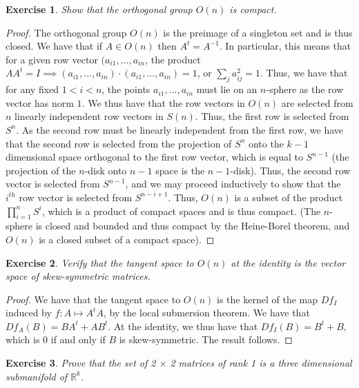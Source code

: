 \documentclass{article}
\newtheorem{exercise}{Exercise}
\begin{document}
\begin{exercise}
Show that the orthogonal group $O(n)$ is compact.
\end{exercise}

\begin{proof}
The orthogonal group $O(n)$ is the preimage of a singleton set and is thus closed. We have that if $A \in O(n)$ then $A^{t} = A^{-1}$. In particular, this means that for a given row vector $(a_{i1},...,a_{in}$, the product $AA^{t} = I \implies (a_{i1},...,a_{in}) \cdot (a_{i1},...,a_{in}) = 1$, or $\sum_{j}a_{ij}^{2} = 1$. Thus, we have that for any fixed $1< i < n$, the points $a_{i1},...,a_{in}$ must lie on an $n$-sphere as the row vector has norm $1$. We thus have that the row vectors in $O(n)$ are selected from $n$ linearly independent row vectors in $S(n)$. Thus, the first row is selected from $S^{n}$. As the second row must be linearly independent from the first row, we have that the second row is selected from the projection of $S^{n}$ onto the $k-1$ dimensional space orthogonal to the first row vector, which is equal to $S^{n-1}$ (the projection of the $n$-disk onto $n-1$ space is the $n-1$-disk). Thus, the second row vector is selected from $S^{n-1}$, and we may proceed inductively to show that the $i^{th}$ row vector is selected from $S^{n-i + 1}$. Thus, $O(n)$ is a subset of the product $\prod_{i=1}^{n} S^{i}$, which is a product of compact spaces and is thus compact. (The $n$-sphere is closed and bounded and thus compact by the Heine-Borel theorem, and $O(n)$ is a closed subset of a compact space).   
\end{proof}

\begin{exercise}
  Verify that the tangent space to $O(n)$ at the identity is the vector space of skew-symmetric matrices. 
\end{exercise}

\begin{proof}
We have that the tangent space to $O(n)$ is the kernel of the map $Df_{I}$ induced by $f: A \mapsto A^{t}A$, by the local submersion theorem. We have that $Df_{A}(B) = BA^{t} + AB^{t}$. At the identity, we thus have that $Df_{I}(B) = B^{t} + B$, which is 0 if and only if $B$ is skew-symmetric. The result follows. 
\end{proof}

\pagebreak

\begin{exercise}
Prove that the set of 2 $\times$ 2 matrices of rank 1 is a three dimensional submanifold of $\mathbb{R}^{k}$. 
\end{exercise}
\end{document}

